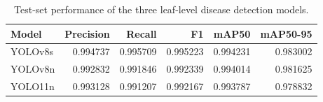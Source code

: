 \begin{table}
\caption{Test-set performance of the three leaf-level disease detection models.}
\label{tab:detection_comparison}
\begin{tabular}{lrrrrr}
\toprule
Model & Precision & Recall & F1 & mAP50 & mAP50-95 \\
\midrule
YOLOv8s & 0.994737 & 0.995709 & 0.995223 & 0.994231 & 0.983002 \\
YOLOv8n & 0.992832 & 0.991846 & 0.992339 & 0.994014 & 0.981625 \\
YOLO11n & 0.993128 & 0.991207 & 0.992167 & 0.993787 & 0.978832 \\
\bottomrule
\end{tabular}
\end{table}
